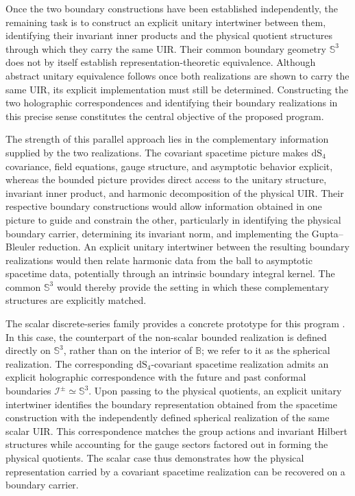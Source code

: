 \documentclass{SciPost}
\begin{document}
Once the two boundary constructions have been established independently, the remaining task is to construct an explicit unitary intertwiner between them, identifying their invariant inner products and the physical quotient structures through which they carry the same UIR. Their common boundary geometry $\mathbb{S}^{3}$ does not by itself establish representation-theoretic equivalence. Although abstract unitary equivalence follows once both realizations are shown to carry the same UIR, its explicit implementation must still be determined. Constructing the two holographic correspondences and identifying their boundary realizations in this precise sense constitutes the central objective of the proposed program.

The strength of this parallel approach lies in the complementary information supplied by the two realizations. The covariant spacetime picture makes $\mathrm{dS}_{4}$ covariance, field equations, gauge structure, and asymptotic behavior explicit, whereas the bounded picture provides direct access to the unitary structure, invariant inner product, and harmonic decomposition of the physical UIR. Their respective boundary constructions would allow information obtained in one picture to guide and constrain the other, particularly in identifying the physical boundary carrier, determining its invariant norm, and implementing the Gupta--Bleuler reduction. An explicit unitary intertwiner between the resulting boundary realizations would then relate harmonic data from the ball to asymptotic spacetime data, potentially through an intrinsic boundary integral kernel. The common $\mathbb{S}^{3}$ would thereby provide the setting in which these complementary structures are explicitly matched.

The scalar discrete-series family provides a concrete prototype for this program \cite{Bajalan2026}. In this case, the counterpart of the non-scalar bounded realization is defined directly on $\mathbb{S}^{3}$, rather than on the interior of $\mathbb{B}$; we refer to it as the spherical realization. The corresponding $\mathrm{dS}_{4}$-covariant spacetime realization admits an explicit holographic correspondence with the future and past conformal boundaries $\mathscr{I}^{\pm}\simeq\mathbb{S}^{3}$. Upon passing to the physical quotients, an explicit unitary intertwiner identifies the boundary representation obtained from the spacetime construction with the independently defined spherical realization of the same scalar UIR. This correspondence matches the group actions and invariant Hilbert structures while accounting for the gauge sectors factored out in forming the physical quotients. The scalar case thus demonstrates how the physical representation carried by a covariant spacetime realization can be recovered on a boundary carrier.
\end{document}
